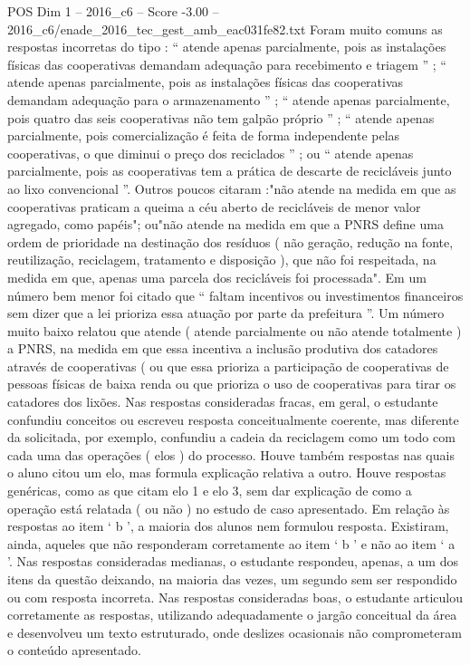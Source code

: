 \begin{textsample}{POS Dim 1 – 2016\_c6 – Score -3.00 – 2016\_c6/enade\_2016\_tec\_gest\_amb\_eac031fe82.txt}
Foram muito comuns as respostas incorretas do tipo : “ atende apenas parcialmente, pois as instalações físicas das cooperativas demandam adequação para recebimento e triagem ” ; “ atende apenas parcialmente, pois as instalações físicas das cooperativas demandam adequação para o armazenamento ” ; “ atende apenas parcialmente, pois quatro das seis cooperativas não tem galpão próprio ” ; “ atende apenas parcialmente, pois comercialização é feita de forma independente pelas cooperativas, o que diminui o preço dos reciclados ” ; ou “ atende apenas parcialmente, pois as cooperativas tem a prática de descarte de recicláveis junto ao lixo convencional ”.
Outros poucos citaram :"não atende na medida em que as cooperativas praticam a queima a céu aberto de recicláveis de menor valor agregado, como papéis"; ou"não atende na medida em que a PNRS define uma ordem de prioridade na destinação dos resíduos ( não geração, redução na fonte, reutilização, reciclagem, tratamento e disposição ), que não foi respeitada, na medida em que, apenas uma parcela dos recicláveis foi processada".
Em um número bem menor foi citado que “ faltam incentivos ou investimentos financeiros sem dizer que a lei prioriza essa atuação por parte da prefeitura ”.
Um número muito baixo relatou que atende ( atende parcialmente ou não atende totalmente ) a PNRS, na medida em que essa incentiva a inclusão produtiva dos catadores através de cooperativas ( ou que essa prioriza a participação de cooperativas de pessoas físicas de baixa renda ou que prioriza o uso de cooperativas para tirar os catadores dos lixões.
Nas respostas consideradas fracas, em geral, o estudante confundiu conceitos ou escreveu resposta conceitualmente coerente, mas diferente da solicitada, por exemplo, confundiu a cadeia da reciclagem como um todo com cada uma das operações ( elos ) do processo.
Houve também respostas nas quais o aluno citou um elo, mas formula explicação relativa a outro.
Houve respostas genéricas, como as que citam elo 1 e elo 3, sem dar explicação de como a operação está relatada ( ou não ) no estudo de caso apresentado.
Em relação às respostas ao item ‘ b ’, a maioria dos alunos nem formulou resposta.
Existiram, ainda, aqueles que não responderam corretamente ao item ‘ b ’ e não ao item ‘ a ’.
Nas respostas consideradas medianas, o estudante respondeu, apenas, a um dos itens da questão deixando, na maioria das vezes, um segundo sem ser respondido ou com resposta incorreta.
Nas respostas consideradas boas, o estudante articulou corretamente as respostas, utilizando adequadamente o jargão conceitual da área e desenvolveu um texto estruturado, onde deslizes ocasionais não comprometeram o conteúdo apresentado.

\end{textsample}
